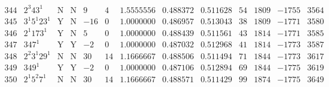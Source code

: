\documentclass[11pt,reqno,a4letter]{article}
\numberwithin{equation}{section}
\numberwithin{figure}{section}
\numberwithin{table}{section}
\theoremstyle{plain}
\numberwithin{theorem}{section}
\theoremstyle{definition}
\begin{document}
\begin{table}[ht]
\begin{equation*}
{\begin{array}{cc|cc|ccc|cc|cccc}
 344 & 2^3 43^1 & \text{N} & \text{N} & 9 & 4 & 1.5555556 & 0.488372 & 0.511628 & 54 & 1809 & -1755 & 3564 \\
 345 & 3^1 5^1 23^1 & \text{Y} & \text{N} & -16 & 0 & 1.0000000 & 0.486957 & 0.513043 & 38 & 1809 & -1771 & 3580 \\
 346 & 2^1 173^1 & \text{Y} & \text{N} & 5 & 0 & 1.0000000 & 0.488439 & 0.511561 & 43 & 1814 & -1771 & 3585 \\
 347 & 347^1 & \text{Y} & \text{Y} & -2 & 0 & 1.0000000 & 0.487032 & 0.512968 & 41 & 1814 & -1773 & 3587 \\
 348 & 2^2 3^1 29^1 & \text{N} & \text{N} & 30 & 14 & 1.1666667 & 0.488506 & 0.511494 & 71 & 1844 & -1773 & 3617 \\
 349 & 349^1 & \text{Y} & \text{Y} & -2 & 0 & 1.0000000 & 0.487106 & 0.512894 & 69 & 1844 & -1775 & 3619 \\
 350 & 2^1 5^2 7^1 & \text{N} & \text{N} & 30 & 14 & 1.1666667 & 0.488571 & 0.511429 & 99 & 1874 & -1775 & 3649 \\
\end{array}
}
\end{equation*}
\clearpage 

\end{table} 
\end{document}
